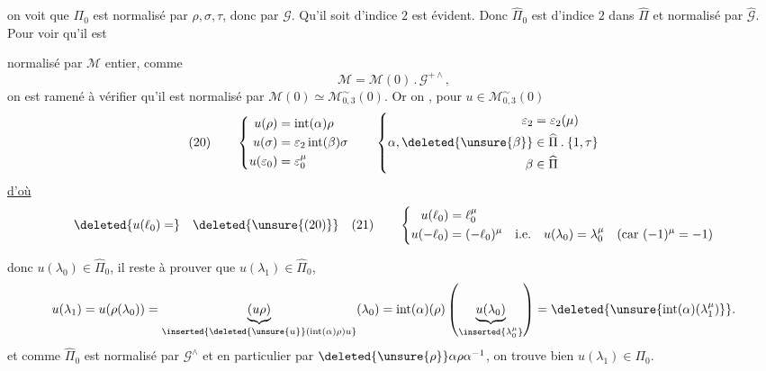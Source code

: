 on voit que $\Pi_0$ est  normalisé par $\rho,\sigma,\tau$, donc par $\mathcal G$. Qu'il soit d'indice $2$ est évident. Donc $\widehat\Pi_0$ est d'indice $2$ dans $\widehat\Pi$ et normalisé par $\widehat{\mathcal G}$. Pour voir qu'il est



normalisé par $\mathcal M$  entier, comme
\[
\mathcal M=\mathcal M(0)\mathbin{.}\mathcal G^{+\wedge},
\]
on est ramené à vérifier qu'il est normalisé par
$\mathcal M(0)\simeq\mathcal M_{0,3}^{\sim}(0)$.
Or on , pour $u\in\mathcal M_{0,3}^{\sim}(0)$
\[
(20)\qquad
\left\{
\begin{aligned}
u(\rho)&=\operatorname{int}(\alpha)\rho\\
u(\sigma)&=\varepsilon_2\operatorname{int}(\beta)\sigma\\
u(\varepsilon_0)&=\varepsilon_0^\mu
\end{aligned}
\right.
\qquad
\left\{
\begin{aligned}
\varepsilon_2&=\varepsilon_2(\mu)\\
\alpha,\deleted{\unsure{\beta}}&\in\widehat{\Pi}\mathbin{.}\{1,\tau\}\\
\beta&\in\widehat{\Pi}
\end{aligned}
\right.
\]
\uline{d'où}
\[
\deleted{u(\ell_0)=}\quad
\deleted{\unsure{(20)}}\quad
(21)\qquad
\left\{
\begin{aligned}
u(\ell_0)&=\ell_0^\mu\\
u(-\ell_0)&=(-\ell_0)^\mu
\quad\text{i.e.}\quad
u(\lambda_0)=\lambda_0^\mu
\quad(\text{car }(-1)^\mu=-1)
\end{aligned}
\right.
\]
\margin{$\unsure{)}$}

donc $u(\lambda_0)\in\widehat{\Pi}_0$, il reste à prouver que
$u(\lambda_1)\in\widehat{\Pi}_0$, 
\[
u(\lambda_1)
=u(\rho(\lambda_0))
=\underbrace{(u\rho)}_{\inserted{\deleted{\unsure{u}}(\operatorname{int}(\alpha)\rho)u}}(\lambda_0)
=\operatorname{int}(\alpha)(\rho)
\left(\underbrace{u(\lambda_0)}_{\inserted{\lambda_0^\mu}}\right)
=\deleted{\unsure{\operatorname{int}(\alpha)(\lambda_1^\mu)}}.
\]
et comme $\widehat{\Pi}_0$ est normalisé par $\mathcal G^\wedge$
et en particulier par $\deleted{\unsure{\rho}}\alpha\rho\alpha^{-1}$,
on trouve bien $u(\lambda_1)\in\Pi_0$.

